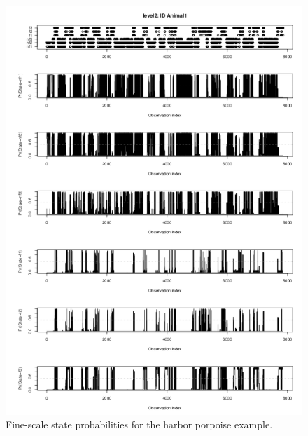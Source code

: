 \documentclass[12pt]{article}\usepackage[]{graphicx}\usepackage[]{xcolor}
\begin{document}
\begin{figure}[htbp]
  \centering
  \includegraphics[width=\textwidth]{plot_harborPorpoiseStates002.pdf}
  \caption{Fine-scale state probabilities for the harbor porpoise example.}
  \label{fig:hpLevel2}
\end{figure}
\end{document}
